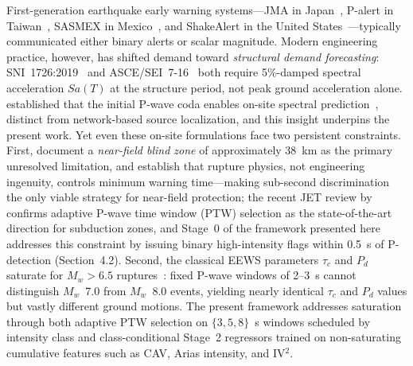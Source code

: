 \documentclass[10pt]{article}
\renewcommand{\cite}[1]{\citep{#1}}
\begin{document}
First-generation earthquake early warning systems---JMA in Japan~\citet{ref7}, P-alert in Taiwan~\citet{ref8}, SASMEX in Mexico~\citet{ref9}, and ShakeAlert in the United States~\citet{ref10}---typically communicated either binary alerts or scalar magnitude. Modern engineering practice, however, has shifted demand toward \emph{structural demand forecasting}: SNI~1726:2019~\cite{ref12} and ASCE/SEI~7-16~\cite{ref13} both require 5\%-damped spectral acceleration $Sa(T)$ at the structure period, not peak ground acceleration alone. \citet{ref16} established that the initial P-wave coda enables on-site spectral prediction~\cite{ref17}, distinct from network-based source localization, and this insight underpins the present work. Yet even these on-site formulations face two persistent constraints. First, \citet{ref18} document a \emph{near-field blind zone} of approximately 38~km as the primary unresolved limitation, and \citet{ref19} establish that rupture physics, not engineering ingenuity, controls minimum warning time---making sub-second discrimination the only viable strategy for near-field protection; the recent JET review by~\cite{jetTatar2025} confirms adaptive P-wave time window (PTW) selection as the state-of-the-art direction for subduction zones, and Stage~0 of the framework presented here addresses this constraint by issuing binary high-intensity flags within 0.5~s of P-detection (Section~4.2). Second, the classical EEWS parameters $\tau_c$ and $P_d$ saturate for $M_w > 6.5$ ruptures~\cite{ref20, ref21}: fixed P-wave windows of 2--3~s cannot distinguish $M_w$~7.0 from $M_w$~8.0 events, yielding nearly identical $\tau_c$ and $P_d$ values but vastly different ground motions. The present framework addresses saturation through both adaptive PTW selection on $\{3, 5, 8\}$~s windows scheduled by intensity class and class-conditional Stage~2 regressors trained on non-saturating cumulative features such as CAV, Arias intensity, and IV$^2$.
\end{document}
